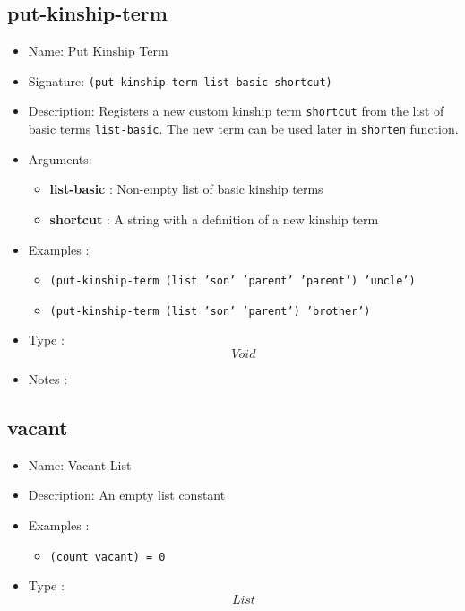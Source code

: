 \subsection{put-kinship-term}
\begin{itemize}
    \item Name: Put Kinship Term
    \item Signature: \texttt{(put-kinship-term list-basic shortcut)}
    \item Description: Registers a new custom kinship term \texttt{shortcut} from the list of basic terms \texttt{list-basic}. The new term can be used later in \texttt{shorten} function.
    \item Arguments:
        \begin{itemize}
            \item \textbf{list-basic} : Non-empty list of basic kinship terms
            \item \textbf{shortcut} : A string with a definition of a new kinship term
        \end{itemize}
    \item Examples :
        \begin{itemize}
            \item \texttt{(put-kinship-term (list 'son' 'parent' 'parent') 'uncle')}
            \item \texttt{(put-kinship-term (list 'son' 'parent') 'brother')}
        \end{itemize}
    \item Type : \[Void\]
    \item Notes :
\end{itemize}

\subsection{vacant}
\begin{itemize}
    \item Name: Vacant List
    \item Description: An empty list constant
    \item Examples :
        \begin{itemize}
            \item \texttt{(count vacant) = 0}
        \end{itemize}
    \item Type : \[List\]
\end{itemize}

